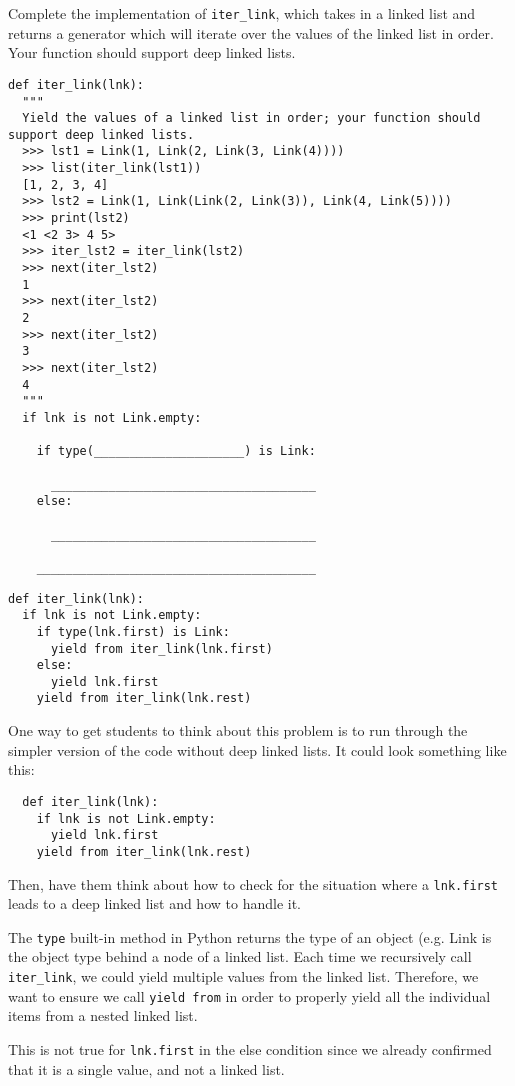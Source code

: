 \begin{blocksection}
\question Complete the implementation of \lstinline{iter_link}, which takes in a linked list and returns a generator which will iterate over the values of the linked list in order. Your function should support deep linked lists.
\vspace{1\baselineskip}
\begin{lstlisting}
def iter_link(lnk):
  """ 
  Yield the values of a linked list in order; your function should support deep linked lists.
  >>> lst1 = Link(1, Link(2, Link(3, Link(4))))
  >>> list(iter_link(lst1))
  [1, 2, 3, 4]
  >>> lst2 = Link(1, Link(Link(2, Link(3)), Link(4, Link(5))))
  >>> print(lst2)
  <1 <2 3> 4 5>
  >>> iter_lst2 = iter_link(lst2)
  >>> next(iter_lst2)
  1
  >>> next(iter_lst2)
  2
  >>> next(iter_lst2) 
  3
  >>> next(iter_lst2)
  4
  """
  if lnk is not Link.empty:

    if type(_____________________) is Link:

      _____________________________________
    else:

      _____________________________________

    _______________________________________
\end{lstlisting}
\end{blocksection}
\begin{blocksection}
\begin{solution}[0.7in]
\begin{lstlisting}
def iter_link(lnk):
  if lnk is not Link.empty:
    if type(lnk.first) is Link:
      yield from iter_link(lnk.first)
    else:
      yield lnk.first
    yield from iter_link(lnk.rest)
\end{lstlisting}
\end{solution}
\end{blocksection}

\begin{blocksection}
\begin{guide}
One way to get students to think about this problem is to run through the simpler version of the code without deep linked lists. It could look something like this:
\begin{lstlisting}
  def iter_link(lnk):
    if lnk is not Link.empty:
      yield lnk.first
    yield from iter_link(lnk.rest)
\end{lstlisting}

Then, have them think about how to check for the situation where a \texttt{lnk.first} leads to a deep linked list and how to handle it.

The \texttt{type} built-in method in Python returns the type of an object (e.g. Link is the object type behind a node of a linked list.
Each time we recursively call \texttt{iter\_link}, we could yield multiple values from the linked list. Therefore, we want to ensure we call \texttt{yield from} in order to properly yield all the  individual items from a nested linked list.

This is not true for \texttt{lnk.first} in the else condition since we already confirmed that it is a single value, and not a linked list.
\end{guide}
\end{blocksection}